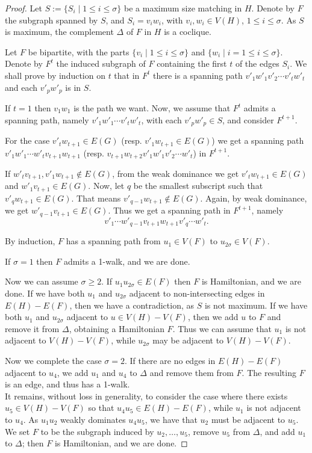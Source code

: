 \documentclass{amsart}
\theoremstyle{definition}
\begin{document}
\begin{proof}
Let $S:=\{S_i\mid 1\leq i\leq  \sigma\}$ be a maximum size matching in $H$.
Denote by $F$ the subgraph spanned by $S$, and
$S_{i}=v_{i}w_{i}$, with $v_i, w_i\in V(H)$, $1\leq i\leq \sigma$. 
As $S$ is maximum, the complement $\Delta$ of $F$ in $H$ is a coclique.

Let $F$ be bipartite, with the parts $\{v_{i}\mid 1\leq i\leq\sigma\}$ and 
$\{w_{i}\mid i=1\leq i\leq\sigma\}$. 
Denote by $F^t$ the induced subgraph of $F$ containing the first $t$ of the edges $S_i$.
We shall prove by induction on $t$ that in $F^t$ there is a spanning path $v'_{1}w'_{1}v'_{2}\cdots v'_{t}w'_{t}$ and each $v'_{p}w'_{p}$ is 
in $S$.

If $t=1$ then $v_{1}w_{1}$ is the path we want. Now, we assume that $F^t$ admits a spanning path, namely $v'_{1}w'_{1}\cdots v'_{t}w'_{t}$, 
with each $v'_{p}w'_{p}\in S$, and consider $F^{t+1}$.

For the case $v'_{t}w_{t+1}\in E(G)$ 
(resp. $v'_{1}w_{t+1}\in E(G)$)
we get a spanning path 
$v'_{1} w'_{1}\cdots w'_{t} v_{t+1} w_{t+1}$
(resp. $v_{t+1} w_{t+2} v'_{1} w'_{1} v'_{2}\cdots w'_{t}$)
in $F^{t+1}$.

If $w'_{t}v_{t+1},v'_{1}w_{t+1}\not\in E(G)$, from the weak dominance
we get $v'_{t}w_{t+1}\in E(G)$ and $w'_{1}v_{t+1}\in E(G)$. Now, let
$q$ be the smallest subscript such that $v'_{q}w_{t+1}\in E(G)$. That
means $v'_{q-1}w_{t+1}\not\in E(G)$. Again, by weak dominance,
we get $w'_{q-1}v_{t+1}\in E(G)$. Thus we get a spanning path in
$F^{t+1}$, namely $$v'_{1}\cdots
w'_{q-1}v_{t+1}w_{t+1}v'_{q}\cdots w'_{t}.$$

By induction, $F$ has a spanning path from $u_1\in V(F)$ to
$u_{2\sigma}\in V(F)$. %

If $\sigma=1$ then $F$ admits a 1-walk,
and we are done.

Now we can assume $\sigma\geq 2$.
If $u_1u_{2\sigma}\in E(F)$ then $F$ is
Hamiltonian, and we are done. 
If we have both $u_1$ and $u_{2\sigma}$ adjacent to non-intersecting edges in $E(H)-E(F)$, 
then we have a contradiction, as $S$ is not maximum.
If we have both $u_1$ and $u_{2\sigma}$ adjacent to  $u\in V(H)-V(F)$, 
then we add $u$ to $F$ and remove it from $\Delta$, obtaining
a Hamiltonian $F$.
Thus we can assume that $u_1$ is not adjacent to  $V(H)-V(F)$, 
while $u_{2\sigma}$ may be adjacent to  $V(H)-V(F)$. 


Now we complete the case $\sigma=2$. 
If there are no edges in $E(H)-E(F)$ adjacent to $u_4$, 
we add $u_1$ and $u_4$ to $\Delta$ and remove them from $F$. 
The resulting $F$ is an edge, and thus has a 1-walk.\\
It remains, without loss in generality,
to consider the case where there exists $u_5\in V(H)-V(F)$ so that
$u_4u_5\in E(H)-E(F)$, while $u_1$ is not
adjacent to $u_4$. As $u_1u_2$ weakly dominates $u_4u_5$, we have that $u_2$ must be 
adjacent to $u_5$. 
We set $F$ to be the subgraph induced by
$u_2,\dots,u_5$, remove $u_5$ from $\Delta$, and add $u_1$ to $\Delta$; then $F$ is Hamiltonian, and we are done.


\end{proof}
\end{document}

